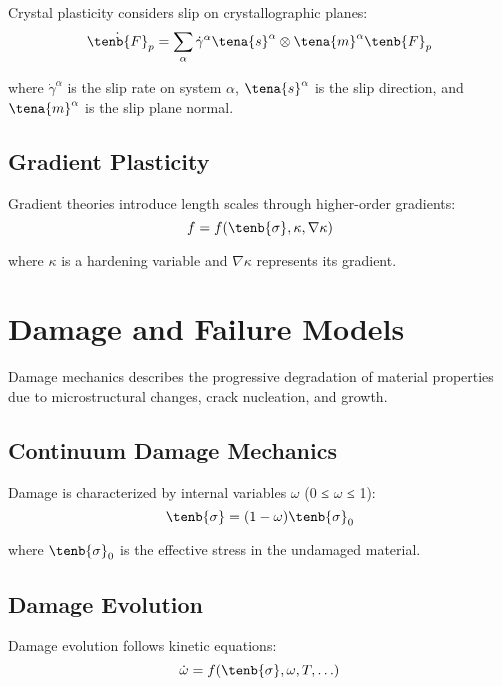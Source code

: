 Crystal plasticity considers slip on crystallographic planes:
\begin{equation}
\dot{\tenb{F}}_p = \sum_{\alpha} \dot{\gamma}^\alpha \tena{s}^\alpha \otimes \tena{m}^\alpha \tenb{F}_p
\end{equation}

where $\dot{\gamma}^\alpha$ is the slip rate on system $\alpha$, $\tena{s}^\alpha$ is the slip direction, and $\tena{m}^\alpha$ is the slip plane normal.

\subsection{Gradient Plasticity}

Gradient theories introduce length scales through higher-order gradients:
\begin{equation}
f = f(\tenb{\sigma}, \kappa, \nabla\kappa)
\end{equation}

where $\kappa$ is a hardening variable and $\nabla\kappa$ represents its gradient.

\section{Damage and Failure Models}

Damage mechanics describes the progressive degradation of material properties due to microstructural changes, crack nucleation, and growth.

\subsection{Continuum Damage Mechanics}

Damage is characterized by internal variables $\omega$ (0 ≤ $\omega$ ≤ 1):
\begin{equation}
\tenb{\sigma} = (1-\omega) \tenb{\sigma}_0
\end{equation}

where $\tenb{\sigma}_0$ is the effective stress in the undamaged material.

\subsection{Damage Evolution}

Damage evolution follows kinetic equations:
\begin{equation}
\dot{\omega} = f(\tenb{\sigma}, \omega, T, \ldots)
\end{equation}

